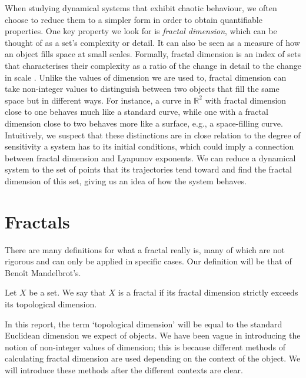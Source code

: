 
When studying dynamical systems that exhibit chaotic behaviour, we often choose to reduce them to a simpler form in order to obtain quantifiable properties. One key property we look for is \emph{fractal dimension}, which can be thought of as a set's complexity or detail. It can also be seen as a measure of how an object fills space at small scales. Formally, fractal dimension is an index of sets that characterises their complexity as a ratio of the change in detail to the change in scale \cite{mandelbrot1983fractal}. Unlike the values of dimension we are used to, fractal dimension can take non-integer values to distinguish between two objects that fill the same space but in different ways. For instance, a curve in $\mathbb{R}^2$ with fractal dimension close to one behaves much like a standard curve, while one with a fractal dimension close to two behaves more like a surface, e.g., a space-filling curve. Intuitively, we suspect that these distinctions are in close relation to the degree of sensitivity a system has to its initial conditions, which could imply a connection between fractal dimension and Lyapunov exponents. We can reduce a dynamical system to the set of points that its trajectories tend toward and find the fractal dimension of this set, giving us an idea of how the system behaves.

\section{Fractals}
There are many definitions for what a fractal really is, many of which are not rigorous and can only be applied in specific cases. Our definition will be that of Benoît Mandelbrot's.
\begin{defn}
    Let $X$ be a set. We say that $X$ is a fractal if its fractal dimension strictly exceeds its topological dimension. \cite{mandelbrot1983fractal}
\end{defn}
In this report, the term `topological dimension' will be equal to the standard Euclidean dimension we expect of objects. We have been vague in introducing the notion of non-integer values of dimension; this is because different methods of calculating fractal dimension are used depending on the context of the object. We will introduce these methods after the different contexts are clear.

